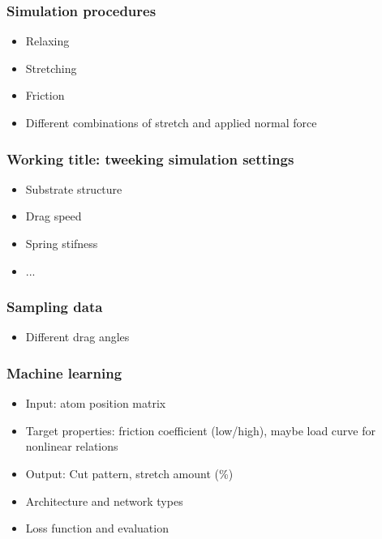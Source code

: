 \documentclass[UKenglish]{book}
\begin{document}
\subsubsection*{Simulation procedures}
\begin{itemize}
  \item Relaxing
  \item Stretching 
  \item Friction 
  \item Different combinations of stretch and applied normal force
\end{itemize}

\subsubsection*{Working title: tweeking simulation settings} %
\begin{itemize}
  \item Substrate structure
  \item Drag speed
  \item Spring stifness
  \item ...
\end{itemize}

\subsubsection*{Sampling data}
\begin{itemize}
  \item Different drag angles
\end{itemize}

\subsubsection*{Machine learning}
\begin{itemize}
  \item Input: atom position matrix
  \item Target properties: friction coefficient (low/high), maybe load curve for nonlinear relations
  \item Output: Cut pattern, stretch amount (\%)
  \item Architecture and network types
  \item Loss function and evaluation
\end{itemize}





\end{document}
